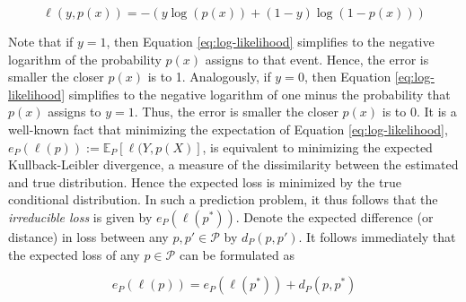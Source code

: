 \documentclass[11pt,a4paper]{article}
\theoremstyle{definition}
\begin{document}
\begin{equation}
\label{eq:log-likelihood}
\ell(y,p(x))=-\left(y\log(p(x))+(1-y)\log(1-p(x))\right)
\end{equation}

Note that if $y=1$, then Equation \eqref{eq:log-likelihood} simplifies to the negative logarithm of the probability $p(x)$ assigns to that event. Hence, the error is smaller the closer $p(x)$ is to 1. Analogously, if $y=0$, then Equation \eqref{eq:log-likelihood} simplifies to the negative logarithm of one minus the probability that $p(x)$ assigns to $y=1$. Thus, the error is smaller the closer $p(x)$ is to 0. It is a well-known fact that minimizing the expectation of Equation \eqref{eq:log-likelihood}, $e_P(\ell(p)):=\mathbb{E}_P[\ell(Y,p(X)]$, is equivalent to minimizing the expected Kullback-Leibler divergence, a measure of the dissimilarity between the estimated and true distribution. Hence the expected loss is minimized by the true conditional distribution. In such a prediction problem, it thus follows that the \emph{irreducible loss} is given by $e_P(\ell(p^*))$. Denote the expected difference (or distance) in loss between any $p,p'\in\mathcal{P}$ by $d_P(p,p')$. It follows immediately that the expected loss of any $p\in\mathcal{P}$ can be formulated as

\begin{equation}
e_P(\ell(p))=e_P(\ell(p^{*}))+d_P(p,p^{*})
\end{equation}
\end{document}
